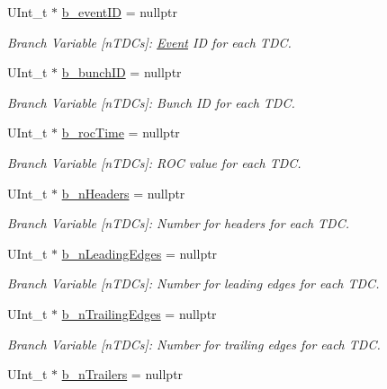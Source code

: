 \begin{DoxyCompactItemize}
U\+Int\+\_\+t $\ast$ \hyperlink{class_event_tree_manager_a3dea1a727165f6864be347642fc0728f}{b\+\_\+event\+ID} = nullptr
\begin{DoxyCompactList}\small\item\em Branch Variable \mbox{[}n\+T\+D\+Cs\mbox{]}\+: \hyperlink{class_event}{Event} ID for each T\+DC. \end{DoxyCompactList}\item 
U\+Int\+\_\+t $\ast$ \hyperlink{class_event_tree_manager_a4953fdf79783fdd5c0b867af1dbd8f3d}{b\+\_\+bunch\+ID} = nullptr
\begin{DoxyCompactList}\small\item\em Branch Variable \mbox{[}n\+T\+D\+Cs\mbox{]}\+: Bunch ID for each T\+DC. \end{DoxyCompactList}\item 
U\+Int\+\_\+t $\ast$ \hyperlink{class_event_tree_manager_acc8b0c67ad8e331ea9fc3f94a57d072b}{b\+\_\+roc\+Time} = nullptr
\begin{DoxyCompactList}\small\item\em Branch Variable \mbox{[}n\+T\+D\+Cs\mbox{]}\+: R\+OC value for each T\+DC. \end{DoxyCompactList}\item 
U\+Int\+\_\+t $\ast$ \hyperlink{class_event_tree_manager_ac85cc79e72eaec4f7554a10e12e4d75a}{b\+\_\+n\+Headers} = nullptr
\begin{DoxyCompactList}\small\item\em Branch Variable \mbox{[}n\+T\+D\+Cs\mbox{]}\+: Number for headers for each T\+DC. \end{DoxyCompactList}\item 
U\+Int\+\_\+t $\ast$ \hyperlink{class_event_tree_manager_ac32836178a53f00fe5417e533a0390f1}{b\+\_\+n\+Leading\+Edges} = nullptr
\begin{DoxyCompactList}\small\item\em Branch Variable \mbox{[}n\+T\+D\+Cs\mbox{]}\+: Number for leading edges for each T\+DC. \end{DoxyCompactList}\item 
U\+Int\+\_\+t $\ast$ \hyperlink{class_event_tree_manager_aabb6a03aaab8095cb3e5e04d8389194a}{b\+\_\+n\+Trailing\+Edges} = nullptr
\begin{DoxyCompactList}\small\item\em Branch Variable \mbox{[}n\+T\+D\+Cs\mbox{]}\+: Number for trailing edges for each T\+DC. \end{DoxyCompactList}\item 
U\+Int\+\_\+t $\ast$ \hyperlink{class_event_tree_manager_ae3d13f63577de75ec8a673ddb8686629}{b\+\_\+n\+Trailers} = nullptr

\end{DoxyCompactItemize}
